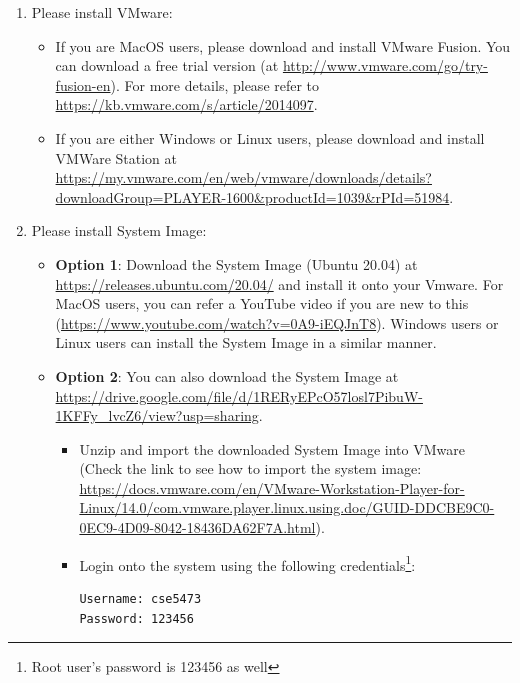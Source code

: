 \documentclass[11pt]{article}
\begin{document}
\begin{enumerate}
\item Please install VMware:
\begin{itemize}
    \item If you are MacOS users, please download and install VMware Fusion. You can  download a free trial version (at \url{http://www.vmware.com/go/try-fusion-en}). For more details, please refer to \url{https://kb.vmware.com/s/article/2014097}. 
    \item If you are either Windows or Linux users, please download and install VMWare Station at \url{https://my.vmware.com/en/web/vmware/downloads/details?downloadGroup=PLAYER-1600&productId=1039&rPId=51984}.  

\end{itemize}
\item Please install System Image:

\begin{itemize}
\item \textbf{Option 1}: Download the System Image (Ubuntu 20.04) at \url{https://releases.ubuntu.com/20.04/} and install it onto your Vmware. For MacOS users, you can refer a YouTube video if you are new to this (\url{https://www.youtube.com/watch?v=0A9-iEQJnT8}). Windows users or Linux users can install the System Image in a similar manner.   
\item \textbf{Option 2}: You can also download the System Image at \url{https://drive.google.com/file/d/1RERyEPcO57losl7PibuW-1KFFy_lvcZ6/view?usp=sharing}. 
\begin{itemize}
\item Unzip and import the downloaded System Image into VMware (Check the link to see how to import the system image:  \url{https://docs.vmware.com/en/VMware-Workstation-Player-for-Linux/14.0/com.vmware.player.linux.using.doc/GUID-DDCBE9C0-0EC9-4D09-8042-18436DA62F7A.html}).
\item Login onto the system using the following credentials\footnote{Root user's password is 123456 as well}: 
 \begin{lstlisting}
Username: cse5473
Password: 123456
\end{lstlisting}\vspace{-6mm}

\end{itemize}
 
\end{itemize}


\end{enumerate}
\end{document}
